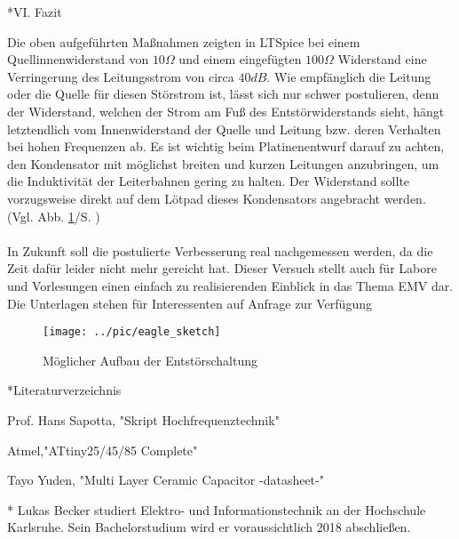 \documentclass[a4paper,10pt, twocolumn]{article}
\begin{document}
\begin{section}*{VI. Fazit}

Die oben aufgeführten Maßnahmen zeigten in LTSpice bei einem 
Quellinnenwiderstand von $10\Omega$ und einem eingefügten $100\Omega$ Widerstand 
eine Verringerung des Leitungsstrom von circa $40dB$. Wie empfänglich die 
Leitung oder die Quelle für diesen Störstrom ist, lässt sich nur schwer 
postulieren, denn der Widerstand, welchen der Strom am Fuß des 
Entstörwiderstands sieht, hängt letztendlich vom Innenwiderstand der Quelle 
und Leitung bzw. deren Verhalten bei hohen Frequenzen ab.
\newline
Es ist wichtig beim Platinenentwurf darauf zu achten, den Kondensator mit 
möglichst breiten und kurzen Leitungen anzubringen, um die Induktivität der 
Leiterbahnen gering zu halten. Der Widerstand sollte vorzugsweise 
direkt auf dem Lötpad dieses Kondensators angebracht werden.\\(Vgl. Abb. 
\ref{aufbau}/S. \pageref{aufbau})\\\\
In Zukunft soll die postulierte Verbesserung real nachgemessen werden, da 
die Zeit dafür leider nicht mehr gereicht hat. Dieser Versuch stellt 
auch für Labore und Vorlesungen einen einfach zu realisierenden Einblick in das 
Thema EMV dar. Die Unterlagen stehen für Interessenten auf Anfrage zur 
Verfügung
\begin{figure}[H]
  \texttt{[image: ../pic/eagle\_sketch]}
  \caption{Möglicher Aufbau der Entstörschaltung}
  \label{aufbau}
\end{figure}
 
\end{section}

\begin{section}*{Literaturverzeichnis}
\begin{enumerate}[label={[\arabic*]}]
  \item Prof. Hans Sapotta, "Skript Hochfrequenztechnik"
  \item Atmel,"ATtiny25/45/85 Complete"
  \item Tayo Yuden, "Multi Layer Ceramic Capacitor -datasheet-" 
\end{enumerate}
\end{section}
\begin{section}*{}
Lukas Becker studiert Elektro- und Informationstechnik an der Hochschule 
Karlsruhe. Sein Bachelorstudium wird er voraussichtlich 2018 abschließen. 
\end{section}
\end{document}
